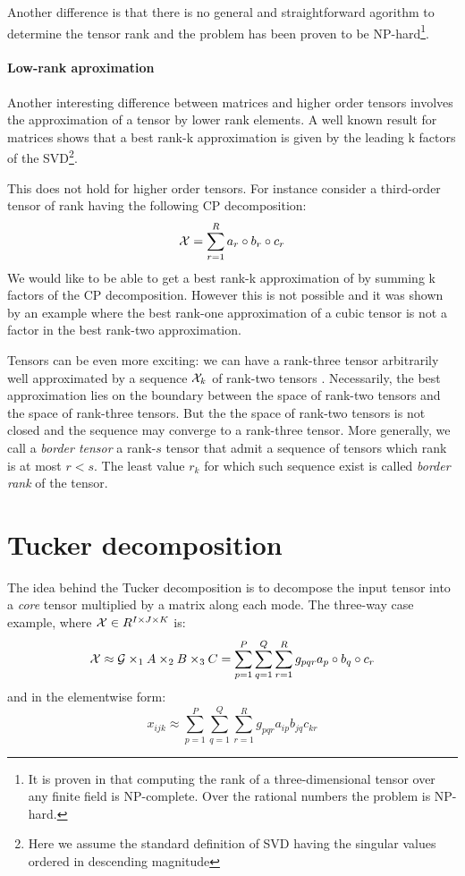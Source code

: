 Another difference is that there is no general and straightforward agorithm to determine the tensor rank and the problem has been proven to be NP-hard\cite{rankNP}\footnote{It is proven in \cite{rankNP} that computing the rank of a three-dimensional tensor over any finite field is NP-complete. Over the rational numbers the problem is NP-hard.}.

\paragraph{Low-rank aproximation}
Another interesting difference between matrices and higher order tensors involves the approximation of a tensor by lower rank elements.
A well known result for matrices \cite{SVDbestapprox} shows that a best rank-k approximation is given by the leading k factors of the SVD\footnote{Here we assume the standard definition of SVD having the singular values ordered in descending magnitude}.

This does not hold for higher order tensors. For instance consider a third-order tensor of rank \R having the following CP decomposition:
\begin{equation*}
  \mathcal{X} = \sum_{r=1}^R a_r \circ b_r \circ c_r
\end{equation*}
We would like to be able to get a best rank-k approximation of \X by summing k factors of the CP decomposition. However this is not possible and it was shown by an example \cite{kolda2001orthogonal} where the best rank-one approximation of a cubic tensor is not a factor in the best rank-two approximation.

Tensors can be even more exciting: we can have a rank-three tensor \X arbitrarily well approximated by a sequence ${\mathcal{X}_k}$ of rank-two tensors \cite{bini1980approximate}. Necessarily, the best approximation lies on the boundary between the space of rank-two tensors and the space of rank-three tensors. But the the space of rank-two tensors is not closed and the sequence may converge to a rank-three tensor.
More generally, we call a \emph{border tensor} a rank-$s$ tensor that admit a sequence of tensors which rank is at most $r < s$. The least value $r_k$ for which such sequence exist is called \emph{border rank} of the tensor.

\section{Tucker decomposition}
The idea behind the Tucker decomposition is to decompose the input tensor into a \emph{core} tensor multiplied by a matrix along each mode.
The three-way case example, where $\mathcal{X} \in R^{I \times J \times K}$ is:
\begin{equation*}
  \mathcal{X} \approx \mathcal{G} \times_1 A \times_2 B \times_3 C = \sum_{p=1}^P \sum_{q=1}^Q \sum_{r=1}^R g_{pqr} a_p \circ b_q \circ c_r
\end{equation*}
and in the elementwise form:
\begin{equation*}
  x_{ijk} \approx \sum_{p=1}^P \sum_{q=1}^Q \sum_{r=1}^R g_{pqr} a_{ip} b_{jq} c_{kr}
\end{equation*}

